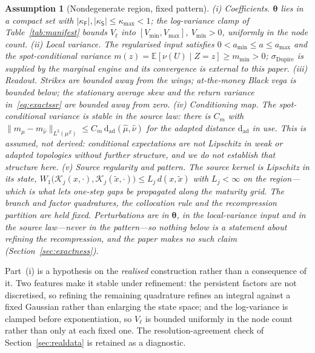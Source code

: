 \documentclass[11pt]{article}
\newtheorem{assumption}{Assumption}
\newcommand{\E}{\mathbb{E}}
\newcommand{\cK}{\mathcal{K}}
\providecommand{\1}{\mathbf 1}
\newcommand{\bth}{{\boldsymbol{\theta}}}
\begin{document}
\begin{assumption}[Nondegenerate region, fixed pattern]
\label{ass:localvar}\label{rem:fixed-pattern}
\emph{(i) Coefficients.} $\bth$ lies in a compact set with $|\kappa_{\mathsf F}|,|\kappa_{\mathsf
S}|\le\kappa_{\max}<1$; the log-variance clamp of Table~\ref{tab:manifest} bounds $V_\ell$ into
$[V_{\min},V_{\max}]$, $V_{\min}>0$, uniformly in the node count.
\emph{(ii) Local variance.} The regularised input satisfies $0<a_{\min}\le a\le a_{\max}$ and the
spot-conditional variance $m(z)=\E[\nu(U)\mid Z{=}z]\ge m_{\min}>0$; $\sigma_{\mathrm{Dupire}}$ is
supplied by the marginal engine and its convergence is external to this paper.
\emph{(iii) Readout.} Strikes are bounded away from the wings; at-the-money Black vega is bounded
below; the stationary average skew and the return variance in~\eqref{eq:exactssr} are bounded away
from zero.
\emph{(iv) Conditioning map.} The spot-conditional variance is stable in the source law: there is
$C_m$ with $\|m_{\widehat\mu}-m_{\widehat\nu}\|_{L^2(\mu^Z)}\le C_m\,\mathrm{d}_{\mathrm{ad}}
(\widehat\mu,\widehat\nu)$ for the adapted distance $\mathrm{d}_{\mathrm{ad}}$ in use. This is
assumed, not derived: conditional expectations are not Lipschitz in weak or adapted topologies
without further structure, and we do not establish that structure here.
\emph{(v) Source regularity and pattern.} The source kernel is Lipschitz in its state,
$W_1\bigl(\cK_j(x,\cdot),\cK_j(\tilde x,\cdot)\bigr)\le L_j\,d(x,\tilde x)$ with $L_j<\infty$ on the
region---which is what lets one-step gaps be propagated along the maturity grid. The branch and
factor quadratures, the collocation rule and the recompression partition are held fixed. Perturbations are in $\bth$, in the local-variance input and in the source
law---never in the pattern---so nothing below is a statement about refining the recompression, and
the paper makes no such claim (Section~\ref{sec:exactness}).
\end{assumption}

\noindent Part~(i) is a hypothesis on the \emph{realised} construction rather than a consequence of
it. Two features make it stable under refinement: the persistent factors are not discretised, so
refining the remaining quadrature refines an integral against a fixed Gaussian rather than enlarging
the state space; and the log-variance is clamped before exponentiation, so $V_\ell$ is bounded
uniformly in the node count rather than only at each fixed one. The resolution-agreement check of
Section~\ref{sec:realdata} is retained as a diagnostic.
\end{document}
